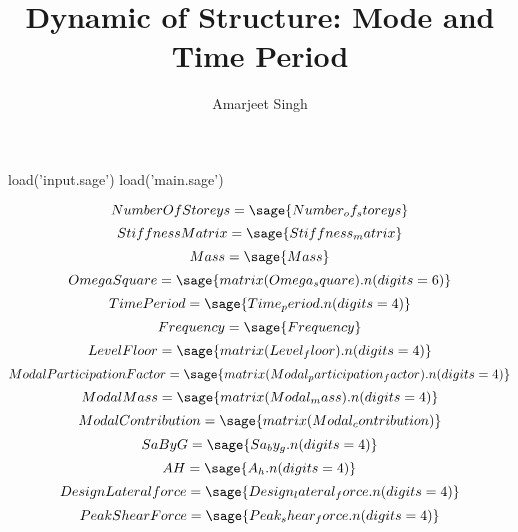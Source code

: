 \documentclass[12pt]{report}
\title{Dynamic of Structure: Mode and Time Period}
\author{Amarjeet Singh }
\begin{document}
\thispagestyle{plain}
	\begin{titlepage}
\maketitle
	\end{titlepage}

\begin{sagesilent}
load('input.sage')
load('main.sage')


\end{sagesilent}
\begin{equation}
	Number Of Storeys = \sage{Number_of_storeys}
\end{equation}
\begin{equation}
	Stiffness Matrix=\sage{Stiffness_matrix}
\end{equation}
\begin{equation}
	Mass =\sage{Mass}
\end{equation}
\begin{equation}
	Omega Square=\sage{matrix(Omega_square).n(digits=6)}
\end{equation}
\begin{equation}
	Time Period=\sage{Time_period.n(digits=4)}
\end{equation}
\begin{equation}
	Frequency=\sage{Frequency}
\end{equation}
\begin{equation}
	Level Floor=\sage{matrix(Level_floor).n(digits=4)}
\end{equation}
\begin{equation}
	Modal Participation Factor = \sage{matrix(Modal_participation_factor).n(digits=4)}
\end{equation}
\begin{equation}
	Modal Mass =\sage{matrix(Modal_mass).n(digits=4)}
\end{equation}
\begin{equation}
	Modal Contribution=\sage{matrix(Modal_contribution)}
\end{equation}
\begin{equation}
	Sa By G =\sage{Sa_by_g.n(digits=4)}
\end{equation}
\begin{equation}
	A H=\sage{A_h.n(digits=4)}
\end{equation}
\begin{equation}
	Design Lateral force=\sage{Design_lateral_force.n(digits=4)}
\end{equation}
\begin{equation}
	Peak Shear Force=\sage{Peak_shear_force.n(digits=4)}
\end{equation}
\end{document}
